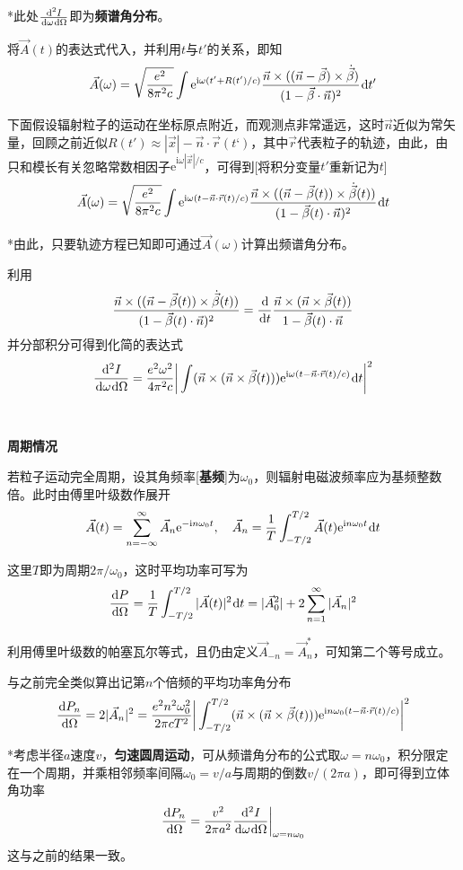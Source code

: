 \documentclass[a4paper,UTF8,fontset=windows]{ctexart}
\newcommand*{\dr}{\hspace{0.07em}\mathrm{d}}
\newcommand*{\er}{\mathrm{e}}
\newcommand*{\ir}{\mathrm{i}}
\newcommand*{\va}{\vec{A}}
\newcommand*{\vns}{\vec{n}}
\newcommand*{\vrs}{\vec{r}}
\newcommand*{\vx}{\vec{x}}
\newcommand*{\vbeta}{\vec{\beta}}
\newcommand*{\dt}[2][t]{\frac{\dr #2}{\dr #1}}
\begin{document}
*此处$\frac{\dr^2I}{\dr\omega\dr\Omega}$即为\textbf{频谱角分布}。

将$\va(t)$的表达式代入，并利用$t$与$t'$的关系，即知
$$\va(\omega)=\sqrt{\frac{e^2}{8\pi^2c}}\int\er^{\ir\omega(t'+R(t')/c)}\frac{\vns\times((\vns-\vbeta)\times\dot{\vbeta})}{(1-\vbeta\cdot\vns)^2}\dr t'$$

下面假设辐射粒子的运动在坐标原点附近，而观测点非常遥远，这时$\vns$近似为常矢量，回顾之前近似$R(t')\approx|\vx|-\vns\cdot\vrs(t‘)$，其中$\vrs$代表粒子的轨迹，由此，由只和模长有关忽略常数相因子$\er^{\ir\omega|\vx|/c}$，可得到[将积分变量$t'$重新记为$t$]
$$\va(\omega)=\sqrt{\frac{e^2}{8\pi^2c}}\int\er^{\ir\omega(t-\vns\cdot\vrs(t)/c)}\frac{\vns\times((\vns-\vbeta(t))\times\dot{\vbeta}(t))}{(1-\vbeta(t)\cdot\vns)^2}\dr t$$

*由此，只要轨迹方程已知即可通过$\va(\omega)$计算出频谱角分布。

利用
$$\frac{\vns\times((\vns-\vbeta(t))\times\dot{\vbeta}(t))}{(1-\vbeta(t)\cdot\vns)^2}=\dt{}\frac{\vns\times(\vns\times\vbeta(t))}{1-\vbeta(t)\cdot\vns}$$
并分部积分可得到化简的表达式
$$\frac{\dr^2I}{\dr\omega\dr\Omega}=\frac{e^2\omega^2}{4\pi^2c}\bigg|\int(\vns\times(\vns\times\vbeta(t)))\er^{\ir\omega(t-\vns\cdot\vrs(t)/c)}\dr t\bigg|^2$$

\

\textbf{周期情况}

若粒子运动完全周期，设其角频率[\textbf{基频}]为$\omega_0$，则辐射电磁波频率应为基频整数倍。此时由傅里叶级数作展开
$$\va(t)=\sum_{n=-\infty}^\infty\va_n\er^{-\ir n\omega_0t},\quad\va_n=\frac{1}{T}\int_{-T/2}^{T/2}\va(t)\er^{\ir n\omega_0t}\dr t$$

这里$T$即为周期$2\pi/\omega_0$，这时平均功率可写为
$$\dt[\Omega]{P}=\frac{1}{T}\int_{-T/2}^{T/2}|\va(t)|^2\dr t=|\va_0^2|+2\sum_{n=1}^\infty|\va_n|^2$$

利用傅里叶级数的帕塞瓦尔等式，且仍由定义$\va_{-n}=\va_n^*$，可知第二个等号成立。

与之前完全类似算出记第$n$个倍频的平均功率角分布
$$\dt[\Omega]{P_n}=2|\va_n|^2=\frac{e^2n^2\omega_0^2}{2\pi cT^2}\bigg|\int_{-T/2}^{T/2}(\vns\times(\vns\times\vbeta(t)))\er^{\ir n\omega_0(t-\vns\cdot\vrs(t)/c)}\bigg|^2$$

*考虑半径$a$速度$v$，\textbf{匀速圆周运动}，可从频谱角分布的公式取$\omega=n\omega_0$，积分限定在一个周期，并乘相邻频率间隔$\omega_0=v/a$与周期的倒数$v/(2\pi a)$，即可得到立体角功率
$$\dt[\Omega]{P_n}=\frac{v^2}{2\pi a^2}\frac{\dr^2I}{\dr\omega\dr\Omega}\bigg|_{\omega=n\omega_0}$$
这与之前的结果一致。
\end{document}
